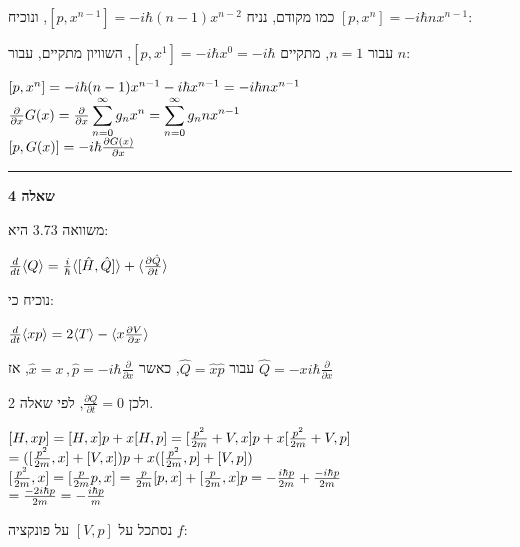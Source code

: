 \documentclass[14pt]{extarticle}
\makeatletter
\newenvironment{lefteqs}{%
    \begin{english}%
    \begin{flushleft}%
    \renewcommand{\arraystretch}{1.3}%
    $\begin{array}{@{}l@{}}%
}{%
    \end{array}$%
    \end{flushleft}%
    \end{english}%
}
\makeatother
\begin{document}
כמו מקודם, נניח $[p,x^{n-1}] = -i\hbar(n-1)x^{n-2}$, ונוכיח $[p,x^n]=-i\hbar nx^{n-1}$:

עבור  $n=1$, מתקיים $[p,x^1]=-i\hbar x^0=-i\hbar$, השוויון מתקיים, עבור $n$:

\begin{lefteqs}
    [p,x^n] = -i\hbar (n-1)x^{n-1}-i\hbar x^{n-1} = -i\hbar n x^{n-1} \\
    \frac{\partial}{\partial x} G(x) = \frac{\partial}{\partial x} \displaystyle\sum_{n=0}^\infty g_n x^n = \displaystyle\sum_{n=0}^\infty g_n n x^{n-1} \\
    {}[p,G(x)] = -i\hbar \frac{\partial G(x)}{\partial x}
\end{lefteqs}

\vspace{3em}
\hrule
\vspace{2em}

\textbf{\large שאלה 4}

משוואה 3.73 היא:
\begin{lefteqs}
    \frac{d}{dt} \langle Q \rangle = \frac{i}{\hbar} \langle [\hat{H},\hat{Q}] \rangle + \langle \frac{\partial \hat{Q}}{\partial t} \rangle \\
\end{lefteqs}

נוכיח כי:
\begin{lefteqs}
    \frac{d}{dt} \langle xp \rangle = 2\langle T \rangle - \langle x \frac{\partial V}{\partial x} \rangle
\end{lefteqs}

עבור $\hat{Q} = \hat{x}\hat{p}$, כאשר $\hat{x}=x \, , \hat{p} = -i\hbar \frac{\partial}{\partial x}$, אז  $\hat{Q} = -xi\hbar \frac{\partial}{\partial x}$

ולכן $\frac{\partial Q}{\partial t} = 0$, לפי שאלה 2.

\begin{lefteqs}
    [H,xp] = [H,x]p + x[H,p] = [\frac{p^2}{2m} + V,x]p + x[\frac{p^2}{2m} + V, p] \\
    = ([\frac{p^2}{2m},x] + [V,x])p + x([\frac{p^2}{2m},p] + [V,p]) \\
    {}[\frac{p^2}{2m},x] = [\frac{p}{2m}p, x] = \frac{p}{2m}[p,x] + [\frac{p}{2m},x]p = -\frac{i\hbar p}{2m} + \frac{-i\hbar p}{2m} \\
    = \frac{-2i\hbar p}{2m} = -\frac{i\hbar p}{m} \\
\end{lefteqs}

נסתכל על $[V,p]$ על פונקציה $f$:
\end{document}
